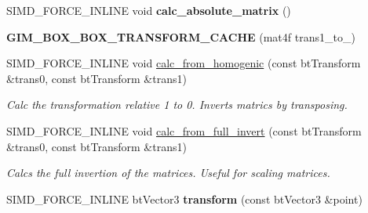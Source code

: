 \begin{DoxyCompactItemize}
\item 
\mbox{\label{classGIM__BOX__BOX__TRANSFORM__CACHE_a2401c410f11f28074f4bfdc2d2750620}} 
S\+I\+M\+D\+\_\+\+F\+O\+R\+C\+E\+\_\+\+I\+N\+L\+I\+NE void {\bfseries calc\+\_\+absolute\+\_\+matrix} ()
\item 
\mbox{\label{classGIM__BOX__BOX__TRANSFORM__CACHE_a68f172ea609d1c6ade9a6b26cb3db5e6}} 
{\bfseries G\+I\+M\+\_\+\+B\+O\+X\+\_\+\+B\+O\+X\+\_\+\+T\+R\+A\+N\+S\+F\+O\+R\+M\+\_\+\+C\+A\+C\+HE} (mat4f trans1\+\_\+to\+\_)
\item 
\mbox{\label{classGIM__BOX__BOX__TRANSFORM__CACHE_abdaefe67a2f2bbf2b89d0ad74fb9a4a5}} 
S\+I\+M\+D\+\_\+\+F\+O\+R\+C\+E\+\_\+\+I\+N\+L\+I\+NE void \hyperlink{classGIM__BOX__BOX__TRANSFORM__CACHE_abdaefe67a2f2bbf2b89d0ad74fb9a4a5}{calc\+\_\+from\+\_\+homogenic} (const bt\+Transform \&trans0, const bt\+Transform \&trans1)
\begin{DoxyCompactList}\small\item\em Calc the transformation relative 1 to 0. Inverts matrics by transposing. \end{DoxyCompactList}\item 
\mbox{\label{classGIM__BOX__BOX__TRANSFORM__CACHE_a29e5ec39ed30a8bc7180a90cba68dc43}} 
S\+I\+M\+D\+\_\+\+F\+O\+R\+C\+E\+\_\+\+I\+N\+L\+I\+NE void \hyperlink{classGIM__BOX__BOX__TRANSFORM__CACHE_a29e5ec39ed30a8bc7180a90cba68dc43}{calc\+\_\+from\+\_\+full\+\_\+invert} (const bt\+Transform \&trans0, const bt\+Transform \&trans1)
\begin{DoxyCompactList}\small\item\em Calcs the full invertion of the matrices. Useful for scaling matrices. \end{DoxyCompactList}\item 
\mbox{\label{classGIM__BOX__BOX__TRANSFORM__CACHE_a75dabf90de88c3077dfba3dbc2005e19}} 
S\+I\+M\+D\+\_\+\+F\+O\+R\+C\+E\+\_\+\+I\+N\+L\+I\+NE bt\+Vector3 {\bfseries transform} (const bt\+Vector3 \&point)
\item 
\mbox{\label{classGIM__BOX__BOX__TRANSFORM__CACHE_a2401c410f11f28074f4bfdc2d2750620}} 

\end{DoxyCompactItemize}
